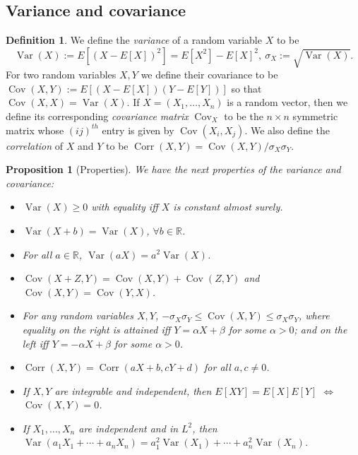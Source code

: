 \documentclass[12pt,reqno]{article}
\renewcommand{\emph}[1]{\textit{#1}}
\theoremstyle{plain}
\newtheorem{prop}[theorem]{Proposition}
\theoremstyle{definition}
\newtheorem{definition}[theorem]{Definition}
\begin{document}
\subsection{Variance and covariance} 

\begin{definition} 
We define the \emph{variance} of a random variable $X$ to be 
\[
\operatorname{Var}(X) := E[(X - E[X])^2] = E[X^2] - E[X]^2,\ 
     \sigma_X := \sqrt{\operatorname{Var}(X)}. 
\]
For two random variables $X,Y$ we define their covariance to be 
$\operatorname{Cov}(X, Y) := E[(X-E[X])(Y-E[Y])]$ so that 
$\operatorname{Cov}(X, X) = \operatorname{Var}(X)$. 
If $X = (X_1,\ldots,X_n)$ is a random vector, then we define its 
corresponding \emph{covariance matrix} $\operatorname{Cov}_X$ to be the 
$n \times n$ symmetric matrix whose $(ij)^{th}$ entry is given by 
$\operatorname{Cov}(X_i, X_j)$. 
We also define the \emph{correlation} of $X$ and $Y$ to be 
$\operatorname{Corr}(X, Y) = \operatorname{Cov}(X, Y) / \sigma_X\sigma_Y$. 
\end{definition} 

\begin{prop}[Properties]
We have the next properties of the variance and covariance: 
\begin{itemize} 

\item[(1)] $\operatorname{Var}(X) \geq 0$ with equality iff 
     $X$ is constant almost surely. 
\item[(2)] $\operatorname{Var}(X+b) = \operatorname{Var}(X)$, 
     $\forall b \in \mathbb{R}$. 
\item[(3)] For all $a \in \mathbb{R}$, 
     $\operatorname{Var}(aX) = a^2 \operatorname{Var}(X)$. 
\item[(4)] $\operatorname{Cov}(X+Z, Y) = \operatorname{Cov}(X, Y) + 
     \operatorname{Cov}(Z, Y)$ and 
     $\operatorname{Cov}(X, Y) = \operatorname{Cov}(Y, X)$. 
\item[(5)] For any random variables $X,Y$, 
     $-\sigma_X\sigma_Y \leq \operatorname{Cov}(X, Y) \leq 
     \sigma_X\sigma_Y$, where equality on the right is attained iff 
     $Y = \alpha X+\beta$ for some $\alpha > 0$; and on the left iff 
     $Y = -\alpha X+\beta$ for some $\alpha > 0$. 
\item[(6)] $\operatorname{Corr}(X, Y) = 
     \operatorname{Corr}(aX+b, cY+d)$ for all $a,c \neq 0$. 
\item[(7)] If $X,Y$ are integrable and independent, then 
     $E[XY] = E[X]E[Y]$ $\iff$ $\operatorname{Cov}(X, Y) = 0$. 
\item[(8)] If $X_1,\ldots,X_n$ are independent and in $L^2$, then 
     $\operatorname{Var}(a_1X_1+\cdots+a_nX_n) = 
     a_1^2 \operatorname{Var}(X_1) + \cdots + 
     a_n^2 \operatorname{Var}(X_n)$. 

\end{itemize} 
\end{prop} 
\end{document}
